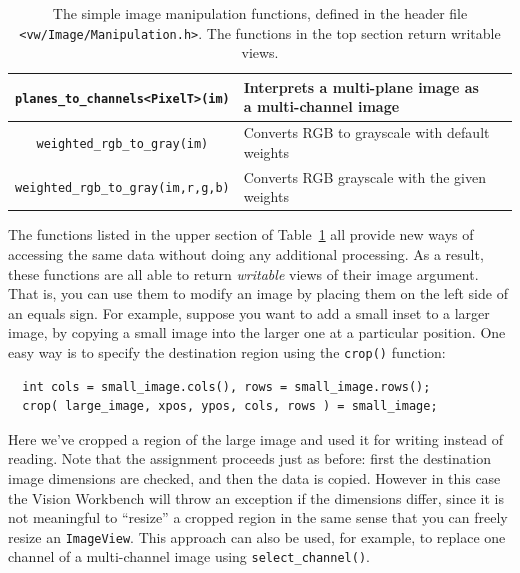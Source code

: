 \begin{table}[t]
\begin{centering}
\begin{tabular}{|c|l|l|}
\verb#planes_to_channels<PixelT>(im)# & Interprets a multi-plane image as a multi-channel image \\ \hline
\verb#weighted_rgb_to_gray(im)# & Converts RGB to grayscale with default weights \\ \hline
\verb#weighted_rgb_to_gray(im,r,g,b)# & Converts RGB grayscale with the given weights \\ \hline
\end{tabular}
\caption{The simple image manipulation functions, defined in the header file 
{\tt <vw/Image/Manipulation.h>}.  The functions in the top section return writable views.}
\label{tbl:image-manipulation}
\end{centering}\end{table}

The functions listed in the upper section of Table~\ref{tbl:image-manipulation} 
all provide new ways of accessing the same data without doing any additional 
processing.  As a result, these functions are all able to return {\it writable} 
views of their image argument.  That is, you can use them to modify an image by 
placing them on the left side of an equals sign.  For example, suppose you want 
to add a small inset to a larger image, by copying a small image into the larger 
one at a particular position.  One easy way is to specify the destination region 
using the \verb#crop()# function:
\begin{verbatim}
  int cols = small_image.cols(), rows = small_image.rows();
  crop( large_image, xpos, ypos, cols, rows ) = small_image;
\end{verbatim}
Here we've cropped a region of the large image and used it for writing
instead of reading.  Note that the assignment proceeds just as before: 
first the destination image dimensions are checked, and then the data 
is copied.  However in this case the Vision Workbench will throw an 
exception if the dimensions differ, since it is not meaningful to 
``resize'' a cropped region in the same sense that you can freely 
resize an \verb#ImageView#.  This approach can also be used, for example, 
to replace one channel of a multi-channel image using
\verb#select_channel()#.

